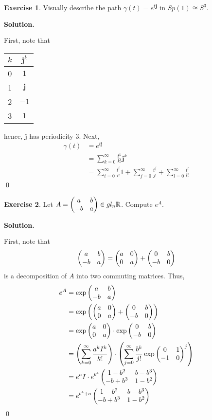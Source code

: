 \documentclass[12pt]{book}
\theoremstyle{definition}
\newtheorem{exercise}{Exercise}[chapter]
\newenvironment{solution}
{%
  \par\noindent\textbf{Solution.}\quad
}
{%
  \qed\par
}
\begin{document}
\begin{exercise}
  Visually describe the path $\gamma(t) = e^{t\mathbf{j}}$ in $Sp(1) \approxeq S^3$.
\end{exercise}

\begin{solution}
  First, note that
  \begin{table}[ht]
    \centering
    \begin{tabular}{c|c}

    $k$ & $\mathbf{j}^k$  \\ 
    \hline
    0 & $1$ \\
    1 & $\mathbf{j}$ \\
    2 & $-1$ \\
    3 & $1$ \\
    \end{tabular}
    \end{table}

  hence, $\mathbf{j}$ has periodicity $3$.
  Next,
  \[
  \begin{aligned}
    \gamma(t) &= e^{t\mathbf{j}} \\
              &= \sum_{k=0}^\infty \frac{t^k}{k!} \mathbf{j}^k\\
              &= \sum_{i=0}^\infty \frac{t^i}{i!}1 + \sum_{j=0}^\infty \frac{t^j}{j!} + \sum_{l=0}^\infty \frac{t^l}{l!}
  \end{aligned}
  \]  
\end{solution}

\begin{exercise}
  Let $A = \begin{pmatrix} a & b \\ -b & a \end{pmatrix} \in gl_n{\mathbb{R}}$.
  Compute $e^A$.
\end{exercise}

\begin{solution}
  First, note that
  \[
    \begin{pmatrix} a & b \\ -b & a \end{pmatrix} = \begin{pmatrix} a & 0 \\ 0 & a \end{pmatrix} + \begin{pmatrix} 0 & b \\ -b & 0 \end{pmatrix}
  \]
  is a decomposition of $A$ into two commuting matrices.
  Thus,
  \[
  \begin{aligned}
    e^A &= \exp{ \begin{pmatrix} a & b \\ -b & a \end{pmatrix} } \\
        &= \exp\left({\begin{pmatrix} a & 0 \\ 0 & a \end{pmatrix} + \begin{pmatrix} 0 & b \\ -b & 0 \end{pmatrix}}\right) \\
        &= \exp\begin{pmatrix} a & 0 \\ 0 & a \end{pmatrix} \cdot \exp\begin{pmatrix} 0 & b \\ -b & 0 \end{pmatrix} \\
        &= \left(\sum_{k=0}^\infty \frac{a^kI^k}{k!} \right) \cdot \left(\sum_{j=0}^\infty \frac{b^k}{j!}\exp\begin{pmatrix} 0 & 1 \\ -1 & 0 \end{pmatrix}^j\right) \\
        &= e^{a}I \cdot e^{b^4}\begin{pmatrix} 1-b^2 & b-b^3 \\ -b+b^3 & 1-b^2 \end{pmatrix} \\
        &= e^{b^4 + a}\begin{pmatrix} 1-b^2 & b-b^3 \\ -b+b^3 & 1-b^2 \end{pmatrix}
  \end{aligned}
  \]
\end{solution}
\end{document}
